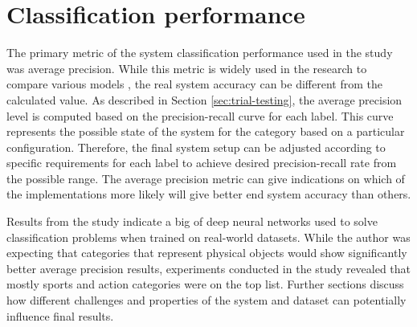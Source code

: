 
\section{Classification performance}
The primary metric of the system classification performance used in the study was average precision. While this metric is widely used in the research to compare various models \cite{Everingham2010PASCAL-VOC}, the real system accuracy can be different from the calculated value. As described in Section \ref{sec:trial-testing}, the average precision level is computed based on the precision-recall curve for each label. This curve represents the possible state of the system for the category based on a particular configuration. Therefore, the final system setup can be adjusted according to specific requirements for each label to achieve desired precision-recall rate from the possible range. The average precision metric can give indications on which of the implementations more likely will give better end system accuracy than others.

Results from the study indicate a big of deep neural networks used to solve classification problems when trained on real-world datasets. While the author was expecting that categories that represent physical objects would show significantly better average precision results, experiments conducted in the study revealed that mostly sports and action categories were on the top list. Further sections discuss how different challenges and properties of the system and dataset can potentially influence final results.





